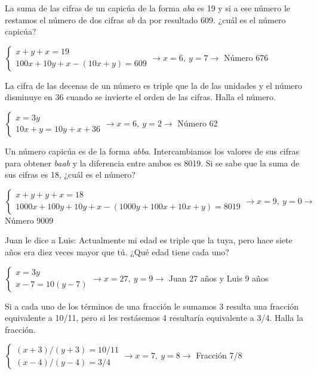 \documentclass[spanish, 12pt]{exam}
\begin{document}
\begin{questions}
\question La suma de las cifras de un capicúa de la forma \emph{aba} es 19 y si a ese número le restamos el número de dos cifras \emph{ab} da por resultado 609. ¿cuál es el número capicúa?
\begin{solution} $\left\{\begin{matrix}x+y+x=19 \\ 100x+10y+x-(10x+y)=609\end{matrix}\right. \to  x = 6, \  y = 7 \to$ Número 676 \end{solution}

\question La cifra de las decenas de un número es triple que la de las unidades y el número disminuye en 36 cuando se invierte el orden de las cifras. Halla el número.
\begin{solution} $\left\{\begin{matrix}x=3y \\ 10x+y=10y+x+36\end{matrix}\right. \to  x = 6, \  y = 2 \to $ Número 62 \end{solution}

\question Un número capicúa es de la forma \emph{abba}. Intercambiamos los valores de sus cifras para obtener \emph{baab} y la diferencia entre ambos es 8019. Si se sabe que la suma de sus cifras es 18, ¿cuál es el número?
\begin{solution} $\left\{\begin{matrix}x+y+y+x=18 \\ 1000x+100y+10y+x-(1000y+100x+10x+y)=8019\end{matrix}\right. \to  x = 9, \  y = 0 \to$ Número 9009 \end{solution}

\question Juan le dice a Luis: Actualmente mi edad es triple que la tuya, pero hace siete años era diez veces mayor que tú. ¿Qué edad tiene cada uno?

\begin{solution} $\left\{\begin{matrix}x=3y \\ x-7=10(y-7)\end{matrix}\right. \to  x = 27, \  y = 9 \to$ Juan 27 años y Luis 9 años \end{solution}

\question Si a cada uno de los términos de una fracción le sumamos 3 resulta una fracción equivalente a 10/11, pero si les restásemos 4 resultaría equivalente a 3/4. Halla la fracción.
\begin{solution} $\left\{\begin{matrix}(x+3)/(y+3)=10/11 \\ (x-4)/(y-4)=3/4\end{matrix}\right. \to  x = 7, \  y = 8 \to$ Fracción 7/8 \end{solution}


\end{questions}
\end{document}
